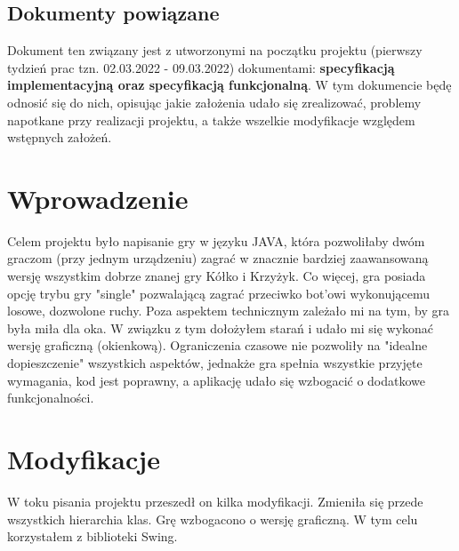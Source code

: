 \documentclass{article}
\begin{document}
\subsection{Dokumenty powiązane}
Dokument ten związany jest z utworzonymi na początku projektu (pierwszy tydzień prac tzn. 02.03.2022 - 09.03.2022) dokumentami: \textbf{specyfikacją implementacyjną oraz specyfikacją funkcjonalną}. W tym dokumencie będę odnosić się do nich, opisując jakie założenia udało się zrealizować, problemy napotkane przy realizacji projektu, a także wszelkie modyfikacje względem wstępnych założeń.

\section{Wprowadzenie}
Celem projektu było napisanie gry w języku JAVA, która pozwoliłaby dwóm graczom (przy jednym urządzeniu) zagrać w znacznie bardziej zaawansowaną wersję wszystkim dobrze znanej gry Kółko i Krzyżyk. Co więcej, gra posiada opcję trybu gry "single" pozwalającą zagrać przeciwko bot'owi wykonującemu losowe, dozwolone ruchy. Poza aspektem technicznym zależało mi na tym, by gra była miła dla oka. W związku z tym dołożyłem starań i udało mi się wykonać wersję graficzną (okienkową). Ograniczenia czasowe nie pozwoliły na "idealne dopieszczenie" wszystkich aspektów, jednakże gra spełnia wszystkie przyjęte wymagania, kod jest poprawny, a aplikację udało się wzbogacić o dodatkowe funkcjonalności.

\section{Modyfikacje}
W toku pisania projektu przeszedł on kilka modyfikacji. Zmieniła się przede wszystkich hierarchia klas. Grę wzbogacono o wersję graficzną. W tym celu korzystałem z biblioteki Swing.
\end{document}

